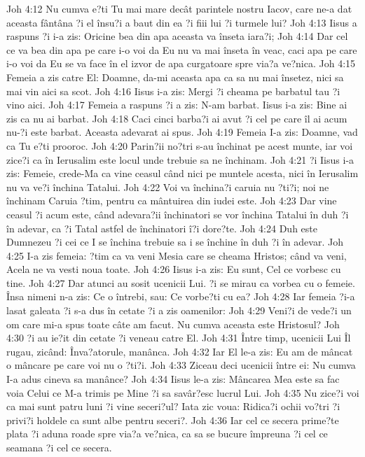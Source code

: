 Joh 4:12  Nu cumva e?ti Tu mai mare decât parintele nostru Iacov, care ne-a dat aceasta fântâna ?i el însu?i a baut din ea ?i fiii lui ?i turmele lui?
Joh 4:13  Iisus a raspuns ?i i-a zis: Oricine bea din apa aceasta va înseta iara?i;
Joh 4:14  Dar cel ce va bea din apa pe care i-o voi da Eu nu va mai înseta în veac, caci apa pe care i-o voi da Eu se va face în el izvor de apa curgatoare spre via?a ve?nica.
Joh 4:15  Femeia a zis catre El: Doamne, da-mi aceasta apa ca sa nu mai însetez, nici sa mai vin aici sa scot.
Joh 4:16  Iisus i-a zis: Mergi ?i cheama pe barbatul tau ?i vino aici.
Joh 4:17  Femeia a raspuns ?i a zis: N-am barbat. Iisus i-a zis: Bine ai zis ca nu ai barbat.
Joh 4:18  Caci cinci barba?i ai avut ?i cel pe care îl ai acum nu-?i este barbat. Aceasta adevarat ai spus.
Joh 4:19  Femeia I-a zis: Doamne, vad ca Tu e?ti prooroc.
Joh 4:20  Parin?ii no?tri s-au închinat pe acest munte, iar voi zice?i ca în Ierusalim este locul unde trebuie sa ne închinam.
Joh 4:21  ?i Iisus i-a zis: Femeie, crede-Ma ca vine ceasul când nici pe muntele acesta, nici în Ierusalim nu va ve?i închina Tatalui.
Joh 4:22  Voi va închina?i caruia nu ?ti?i; noi ne închinam Caruia ?tim, pentru ca mântuirea din iudei este.
Joh 4:23  Dar vine ceasul ?i acum este, când adevara?ii închinatori se vor închina Tatalui în duh ?i în adevar, ca ?i Tatal astfel de închinatori î?i dore?te.
Joh 4:24  Duh este Dumnezeu ?i cei ce I se închina trebuie sa i se închine în duh ?i în adevar.
Joh 4:25  I-a zis femeia: ?tim ca va veni Mesia care se cheama Hristos; când va veni, Acela ne va vesti noua toate.
Joh 4:26  Iisus i-a zis: Eu sunt, Cel ce vorbesc cu tine.
Joh 4:27  Dar atunci au sosit ucenicii Lui. ?i se mirau ca vorbea cu o femeie. Însa nimeni n-a zis: Ce o întrebi, sau: Ce vorbe?ti cu ea?
Joh 4:28  Iar femeia ?i-a lasat galeata ?i s-a dus în cetate ?i a zis oamenilor:
Joh 4:29  Veni?i de vede?i un om care mi-a spus toate câte am facut. Nu cumva aceasta este Hristosul?
Joh 4:30  ?i au ie?it din cetate ?i veneau catre El.
Joh 4:31  Între timp, ucenicii Lui Îl rugau, zicând: Înva?atorule, manânca.
Joh 4:32  Iar El le-a zis: Eu am de mâncat o mâncare pe care voi nu o ?ti?i.
Joh 4:33  Ziceau deci ucenicii între ei: Nu cumva I-a adus cineva sa manânce?
Joh 4:34  Iisus le-a zis: Mâncarea Mea este sa fac voia Celui ce M-a trimis pe Mine ?i sa savâr?esc lucrul Lui.
Joh 4:35  Nu zice?i voi ca mai sunt patru luni ?i vine seceri?ul? Iata zic voua: Ridica?i ochii vo?tri ?i privi?i holdele ca sunt albe pentru seceri?.
Joh 4:36  Iar cel ce secera prime?te plata ?i aduna roade spre via?a ve?nica, ca sa se bucure împreuna ?i cel ce seamana ?i cel ce secera.
